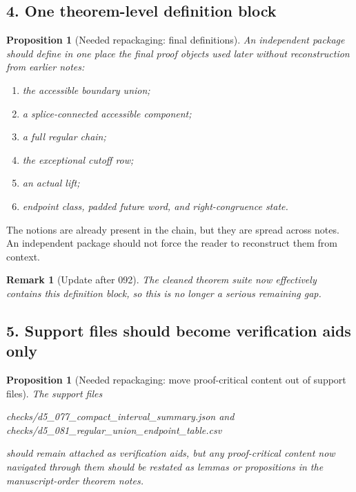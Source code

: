 \documentclass[11pt]{article}
\newtheorem{proposition}[theorem]{Proposition}
\newtheorem{remark}[theorem]{Remark}
\begin{document}
\subsection*{4. One theorem-level definition block}

\begin{proposition}[Needed repackaging: final definitions]
An independent package should define in one place the final proof objects used
later without reconstruction from earlier notes:
\begin{enumerate}[label=\textup{(\alph*)},leftmargin=2.2em]
\item the accessible boundary union;
\item a splice-connected accessible component;
\item a full regular chain;
\item the exceptional cutoff row;
\item an actual lift;
\item endpoint class, padded future word, and right-congruence state.
\end{enumerate}
\end{proposition}

The notions are already present in the chain, but they are spread across
notes. An independent package should not force the reader to reconstruct them
from context.

\begin{remark}[Update after 092]
The cleaned theorem suite now effectively contains this definition block, so
this is no longer a serious remaining gap.
\end{remark}

\subsection*{5. Support files should become verification aids only}

\begin{proposition}[Needed repackaging: move proof-critical content out of
support files]
The support files
\begin{center}
\ttfamily
checks/d5\_077\_compact\_interval\_summary.json \quad and \quad
checks/d5\_081\_regular\_union\_endpoint\_table.csv
\end{center}
should remain attached as verification aids, but any proof-critical content now
navigated through them should be restated as lemmas or propositions in the
manuscript-order theorem notes.
\end{proposition}
\end{document}
